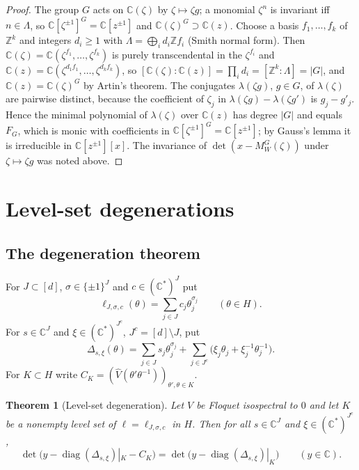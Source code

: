 \documentclass[11pt,reqno]{amsart}
\newtheorem{theorem}{Theorem}[section]
\theoremstyle{definition}
\theoremstyle{remark}
\newcommand{\C}{\mathbb C}
\newcommand{\Z}{\mathbb Z}
\DeclareMathOperator{\diag}{diag}
\begin{document}
\begin{proof}
The group $G$ acts on $\C(\zeta)$ by $\zeta\mapsto\zeta g$; a monomial
$\zeta^n$ is invariant iff $n\in\Lambda$, so
$\C[\zeta^{\pm1}]^G=\C[z^{\pm1}]$ and $\C(\zeta)^G\supset\C(z)$.  Choose a basis
$f_1,\dots,f_k$ of $\Z^k$ and integers $d_i\ge1$ with
$\Lambda=\bigoplus_id_i\Z f_i$ (Smith normal form).  Then
$\C(\zeta)=\C(\zeta^{f_1},\dots,\zeta^{f_k})$ is purely transcendental in the
$\zeta^{f_i}$ and $\C(z)=\C(\zeta^{d_1f_1},\dots,\zeta^{d_kf_k})$, so
$[\C(\zeta):\C(z)]=\prod_id_i=[\Z^k:\Lambda]=|G|$, and $\C(z)=\C(\zeta)^G$ by
Artin's theorem.  The conjugates $\lambda(\zeta g)$, $g\in G$, of
$\lambda(\zeta)$ are pairwise distinct, because the coefficient of $\zeta_j$ in
$\lambda(\zeta g)-\lambda(\zeta g')$ is $g_j-g'_j$.  Hence the minimal
polynomial of $\lambda(\zeta)$ over $\C(z)$ has degree $|G|$ and equals $F_G$,
which is monic with coefficients in $\C[\zeta^{\pm1}]^G=\C[z^{\pm1}]$; by Gauss's
lemma it is irreducible in $\C[z^{\pm1}][x]$.  The invariance of
$\det(x-M^G_W(\zeta))$ under $\zeta\mapsto\zeta g$ was noted above.
\end{proof}

\section{Level-set degenerations}\label{sec:degeneration}

\subsection{The degeneration theorem}
For $J\subset[d]$, $\sigma\in\{\pm1\}^J$ and $c\in(\C^*)^J$ put
\[
 \ell_{J,\sigma,c}(\theta)=\sum_{j\in J}c_j\theta_j^{\sigma_j}\qquad(\theta\in H).
\]
For $s\in\C^J$ and $\xi\in(\C^*)^{J^c}$, $J^c=[d]\setminus J$, put
\[
 \Delta_{s,\xi}(\theta)=\sum_{j\in J}s_j\theta_j^{\sigma_j}+\sum_{j\in J^c}\bigl(\xi_j\theta_j+\xi_j^{-1}\theta_j^{-1}\bigr).
\]
For $K\subset H$ write $C_K=(\widehat V(\theta'\theta^{-1}))_{\theta',\theta\in K}$.

\begin{theorem}[Level-set degeneration]\label{thm:degeneration}
Let $V$ be Floquet isospectral to $0$ and let $K$ be a nonempty level set of
$\ell=\ell_{J,\sigma,c}$ in $H$.  Then for all $s\in\C^J$ and $\xi\in(\C^*)^{J^c}$,
\begin{equation}\label{eq:degeneration}
 \det\bigl(y-\diag(\Delta_{s,\xi})|_K-C_K\bigr)=\det\bigl(y-\diag(\Delta_{s,\xi})|_K\bigr)\qquad(y\in\C).
\end{equation}
\end{theorem}
\end{document}
